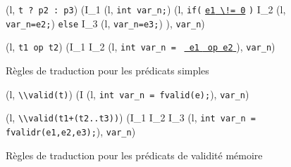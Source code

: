 \begin{figure*}[bt]
{    {
      {
        (l, \mbox{\lstinline't ? p2 : p3'}) 
        (I_1 \concat (l, \mbox{\lstinline'int var_n;'})
        \concat (l,  \mbox{\lstinline'if('}
        \underline{\mbox{\lstinline'e1'}\Zclear \mbox{\lstinline' \!= 0'}}
        \mbox{\lstinline')'} \bopen
        I_2 \concat (l, \mbox{\lstinline'var_n=e2;'}) \bclose
        \mbox{\lstinline'else'} \bopen
        I_3 \concat (l, \mbox{\lstinline'var_n=e3;'}) \bclose),
        \mbox{\lstinline'var_n'})
      }
    }

    {
      {(l, \mbox{\lstinline't1 op t2'}) 
        (I_1 \concat I_2 \concat (l,
        \mbox{\lstinline'int var_n ='}~
        \underline{\mbox{\lstinline' e1'} \Zclear \mbox{\lstinline' op e2'}
          \Zclear}
        \semicolon
        ), \mbox{\lstinline'var_n'})}
    }
  }
  \caption{Règles de traduction pour les prédicats simples}
  \label{fig:pred-logic}
\end{figure*}

\begin{figure*}[bt]
  \scriptsize{
    {
      {(l, \mbox{\lstinline'\\valid(t)'}) 
        (I \concat (l, \mbox{\lstinline'int var_n = fvalid(e);'}),
        \mbox{\lstinline'var_n'})
      }
    }

    { {
        (l, \mbox{\lstinline'\\valid(t1+(t2..t3))'}) 
        (I_1 \concat I_2 \concat I_3
        \concat (l, \mbox{\lstinline'int var_n = fvalidr(e1,e2,e3);'}),
        \mbox{\lstinline'var_n'})
      }
    }
  }
  \caption{Règles de traduction pour les prédicats de validité mémoire}
  \label{fig:valid}
\end{figure*}

